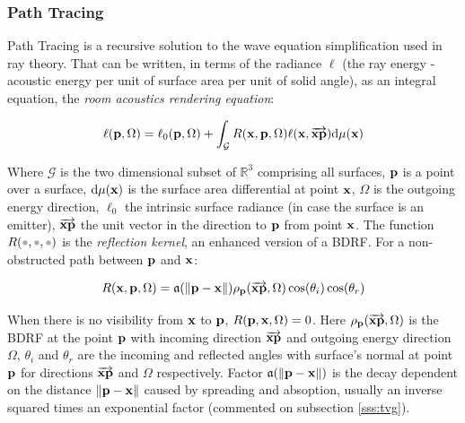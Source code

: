 \subsubsection{Path Tracing}

Path Tracing is a recursive solution to the wave equation simplification used in
ray theory. That can be written, in terms of the radiance $\ell$ (the ray
energy - acoustic energy per unit of surface area per unit of solid angle), as an
integral equation, the \textit{room acoustics rendering
equation}\cite{siltanen2007room}:

\begin{equation}
\label{eq:roomacoustics}
\ell (\mathrm{\mathbf{p}},\Omega) = \ell_0(\mathrm{\mathbf{p}},\Omega) + \int_\mathcal{G}
R(\mathrm{\mathbf{x}},\mathrm{\mathbf{p}},\Omega) \ell
(\mathrm{\mathbf{x}},\overrightarrow{\mathrm{\mathbf{x}}\mathrm{\mathbf{p}}} ) \mathrm{d}\mu(\mathrm{\mathbf{x}})
\end{equation}

Where $\mathcal{G}$ is the two dimensional subset of $\mathbb{R}^3$ comprising
all surfaces, $\mathrm{\mathbf{p}}$ is a point over a surface, $\mathrm{d}\mu(\mathrm{\mathbf{x}})$ is the
surface area differential at point $\mathrm{\mathbf{x}}$, $\Omega$ is the outgoing
energy direction, $\ell_0$ the intrinsic surface radiance (in case the surface is an emitter), $\overrightarrow{\mathrm{\mathbf{x}}\mathrm{\mathbf{p}}}$ the unit vector in the direction to $\mathrm{\mathbf{p}}$ from point $\mathrm{\mathbf{x}}$. The function $R(\parm,\parm,\parm)$ is the
\textit{reflection kernel}, an enhanced version of a BDRF. For a non-obstructed path between 
$\mathrm{\mathbf{p}}$ and $\mathrm{\mathbf{x}}$:

\begin{equation}
\label{eq:reflectionkernel}
R(\mathrm{\mathbf{x}},\mathrm{\mathbf{p}},\Omega) =
\mathfrak{a}(\left\lVert\mathrm{\mathbf{p}}-\mathrm{\mathbf{x}}\right\rVert)\rho_{\mathrm{\mathbf{p}}}(\overrightarrow{\mathrm{\mathbf{x}}\mathrm{\mathbf{p}}},\Omega)\cos(\theta_i)\cos(\theta_r)
\end{equation}

When there is no visibility from  $\mathrm{\mathbf{x}}$ to $\mathrm{\mathbf{p}}$,
$R(\mathrm{\mathbf{p}},\mathrm{\mathbf{x}},\Omega) = 0$. Here
$\rho_{\mathrm{\mathbf{p}}}(\overrightarrow{\mathrm{\mathbf{x}}\mathrm{\mathbf{p}}},\Omega)$ is the BDRF at the
point $\mathrm{\mathbf{p}}$ with incoming direction $\overrightarrow{\mathrm{\mathbf{x}}\mathrm{\mathbf{p}}}$
and outgoing energy direction $\Omega$, $\theta_i$ and $\theta_r$ are the
incoming and reflected angles with surface's normal at point $\mathrm{\mathbf{p}}$ for directions $\overrightarrow{\mathrm{\mathbf{x}}\mathrm{\mathbf{p}}}$
and $\Omega$ respectively. Factor $\mathfrak{a}(\left\lVert\mathrm{\mathbf{p}}-\mathrm{\mathbf{x}}\right\rVert)$ is
the decay dependent on the distance $\left\lVert\mathrm{\mathbf{p}}-\mathrm{\mathbf{x}}\right\rVert$ caused
by spreading and absoption, usually an inverse squared times an exponential
factor (commented on subsection \ref{sss:tvg}).

